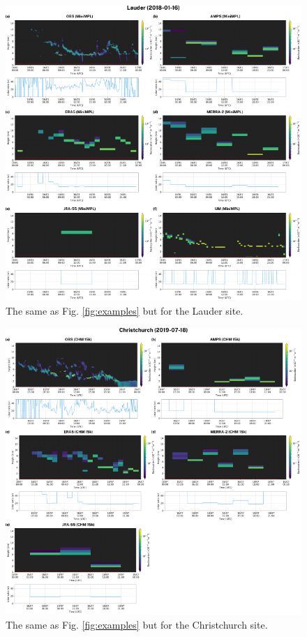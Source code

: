 \begin{figure}[t]
\centering
\includegraphics[width=\textwidth]{chapter3/fig/examples2.pdf}
\caption{
The same as Fig. \ref{fig:examples} but for the Lauder site.
}
\label{fig:examples2}
\end{figure}

\clearpage

\begin{figure}[t]
\centering
\includegraphics[width=\textwidth]{chapter3/fig/examples3.pdf}
\caption{
The same as Fig. \ref{fig:examples} but for the Christchurch site.
}
\label{fig:examples3}
\end{figure}

